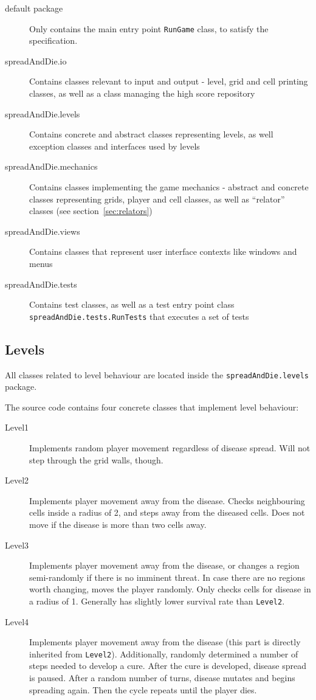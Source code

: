 \documentclass[a4paper]{article}
\begin{document}
	\begin{description}
		\item[default package] Only contains the main entry point \verb|RunGame| class, to satisfy the specification.
		\item[spreadAndDie.io] Contains classes relevant to input and output - level, grid and cell printing classes, as well as a class managing the high score repository
		\item[spreadAndDie.levels] Contains concrete and abstract classes representing levels, as well exception classes and interfaces used by levels
		\item[spreadAndDie.mechanics] Contains classes implementing the game mechanics - abstract and concrete classes representing grids, player and cell classes, as well as ``relator'' classes (see section~\ref{sec:relators})
		\item[spreadAndDie.views] Contains classes that represent user interface contexts like windows and menus
		\item[spreadAndDie.tests] Contains test classes, as well as a test entry point class \verb|spreadAndDie.tests.RunTests| that executes a set of tests
	\end{description}
	
	\subsection{Levels}
		
		All classes related to level behaviour are located inside the \verb|spreadAndDie.levels| package.
		
		The source code contains four concrete classes that implement level behaviour:
		\begin{description}
		\item[Level1] Implements random player movement regardless of disease spread. Will not step through the grid walls, though.
		\item[Level2] Implements player movement away from the disease. Checks neighbouring cells inside a radius of 2, and steps away from the diseased cells. Does not move if the disease is more than two cells away.
		\item[Level3] Implements player movement away from the disease, or changes a region semi-randomly if there is no imminent threat. In case there are no regions worth changing, moves the player randomly. Only checks cells for disease in a radius of 1. Generally has slightly lower survival rate than \verb|Level2|.
		\item[Level4] Implements player movement away from the disease (this part is directly inherited from \verb|Level2|). Additionally, randomly determined a number of steps needed to develop a cure. After the cure is developed, disease spread is paused. After a random number of turns, disease mutates and begins spreading again. Then the cycle repeats until the player dies.
		\end{description}
		
\end{document}

